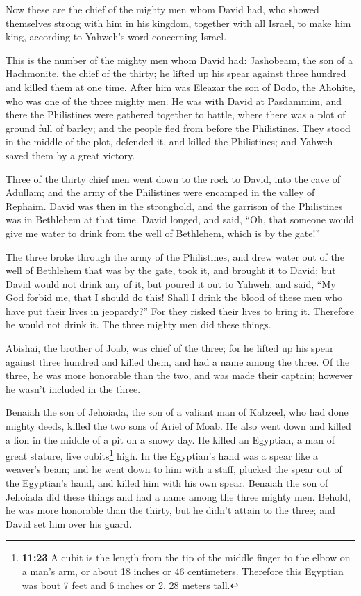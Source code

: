  Now these are the chief of the mighty men whom David
had, who showed themselves strong with him in his kingdom, together with
all Israel, to make him king, according to Yahweh's word concerning
Israel.

 This is the number of the mighty men whom David had:
Jashobeam, the son of a Hachmonite, the chief of the thirty; he lifted
up his spear against three hundred and killed them at one time.
 After him was Eleazar the son of Dodo, the Ahohite, who
was one of the three mighty men.  He was with David at
Pasdammim, and there the Philistines were gathered together to battle,
where there was a plot of ground full of barley; and the people fled
from before the Philistines.  They stood in the middle of
the plot, defended it, and killed the Philistines; and Yahweh saved them
by a great victory.

 Three of the thirty chief men went down to the rock to
David, into the cave of Adullam; and the army of the Philistines were
encamped in the valley of Rephaim.  David was then in the
stronghold, and the garrison of the Philistines was in Bethlehem at that
time.  David longed, and said, ``Oh, that someone would
give me water to drink from the well of Bethlehem, which is by the
gate!''

 The three broke through the army of the Philistines, and
drew water out of the well of Bethlehem that was by the gate, took it,
and brought it to David; but David would not drink any of it, but poured
it out to Yahweh,  and said, ``My God forbid me, that I
should do this! Shall I drink the blood of these men who have put their
lives in jeopardy?'' For they risked their lives to bring it. Therefore
he would not drink it. The three mighty men did these things.

 Abishai, the brother of Joab, was chief of the three;
for he lifted up his spear against three hundred and killed them, and
had a name among the three.  Of the three, he was more
honorable than the two, and was made their captain; however he wasn't
included in the three.

 Benaiah the son of Jehoiada, the son of a valiant man of
Kabzeel, who had done mighty deeds, killed the two sons of Ariel of
Moab. He also went down and killed a lion in the middle of a pit on a
snowy day.  He killed an Egyptian, a man of great
stature, five cubits\footnote{\textbf{11:23} A cubit is the length from
  the tip of the middle finger to the elbow on a man's arm, or about 18
  inches or 46 centimeters. Therefore this Egyptian was bout 7 feet and
  6 inches or 2. 28 meters tall.} high. In the Egyptian's hand was a
spear like a weaver's beam; and he went down to him with a staff,
plucked the spear out of the Egyptian's hand, and killed him with his
own spear.  Benaiah the son of Jehoiada did these things
and had a name among the three mighty men.  Behold, he
was more honorable than the thirty, but he didn't attain to the three;
and David set him over his guard.

